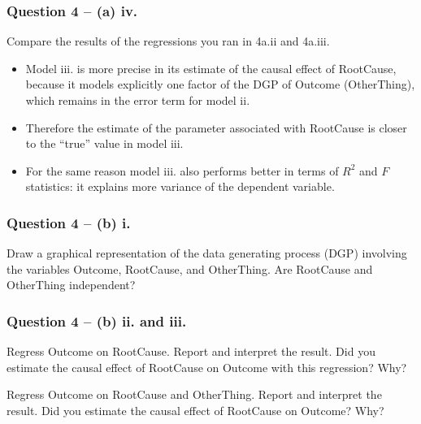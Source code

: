 \documentclass[xcolor=table]{beamer}
\begin{document}
\begin{frame}
\frametitle{Question 4 -- (a) iv.}
Compare the results of the regressions you ran in 4a.ii and 4a.iii. \pause

\begin{itemize}
\item Model iii. is more precise in its estimate of the causal effect of RootCause, because it models explicitly one factor of the DGP of Outcome (OtherThing), which remains in the error term for model ii. \pause

\item Therefore the estimate of the parameter associated with RootCause is closer to the ``true'' value in model iii. \pause

\item For the same reason model iii. also performs better in terms of $R^2$ and $F$ statistics: it explains more variance of the dependent variable.
\end{itemize}
\end{frame}


\begin{frame}[fragile]
\frametitle{Question 4 -- (b) i.}
Draw a graphical representation of the data generating process (DGP) involving
the variables Outcome, RootCause, and OtherThing. \pause Are RootCause and
OtherThing independent? \pause

\begin{center}
\end{center}
\end{frame}

\begin{frame}
\frametitle{Question 4 -- (b) ii. and iii.}
Regress Outcome on RootCause. Report and interpret the result. \pause Did you
estimate the causal effect of RootCause on Outcome with this regression? Why? \pause

Regress Outcome on RootCause and OtherThing. Report and interpret the result. \pause Did you estimate the causal effect of RootCause on Outcome? Why?
\end{frame}
\end{document}
